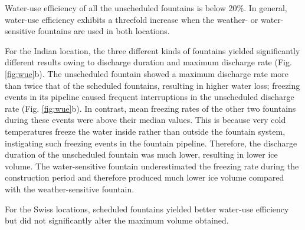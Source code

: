 Water-use efficiency of all the unscheduled fountains is below 20\%. In general, water-use efficiency
exhibits a threefold increase when the weather- or water-sensitive fountains are used in both
locations.

For the Indian location, the three different kinds of fountains yielded significantly different results owing to discharge
duration and maximum discharge rate
(Fig. \ref{fig:wue}b). The unscheduled fountain showed a maximum discharge rate more than twice that of
the scheduled fountains, resulting in higher water loss; freezing events in its pipeline caused frequent
interruptions in the unscheduled discharge rate (Fig. \ref{fig:wue}b). In contrast, mean freezing
rates of the other two fountains during these events were above their median values. This is because very cold
temperatures freeze the water inside rather than outside the fountain system, instigating such freezing events in
the fountain pipeline. Therefore, the discharge duration of the unscheduled fountain was much lower, resulting in
lower ice volume. The water-sensitive fountain underestimated the freezing rate during the construction period
and therefore produced much lower ice volume compared with the weather-sensitive fountain.

For the Swiss locations, scheduled fountains yielded better water-use efficiency but did not significantly alter
the maximum volume obtained.

